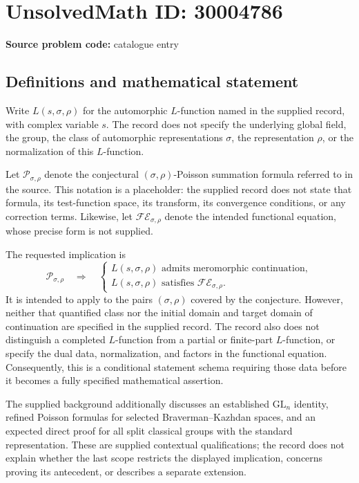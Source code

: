 \documentclass[11pt]{article}
\begin{document}
\section*{UnsolvedMath ID: 30004786}
\textbf{Source problem code:} catalogue entry
\subsection{Definitions and mathematical statement}
Write \(L(s,\sigma,\rho)\) for the automorphic \(L\)-function named in the supplied record, with complex variable \(s\). The record does not specify the underlying global field, the group, the class of automorphic representations \(\sigma\), the representation \(\rho\), or the normalization of this \(L\)-function.

Let \(\mathcal P_{\sigma,\rho}\) denote the conjectural \((\sigma,\rho)\)-Poisson summation formula referred to in the source. This notation is a placeholder: the supplied record does not state that formula, its test-function space, its transform, its convergence conditions, or any correction terms. Likewise, let \(\mathcal{FE}_{\sigma,\rho}\) denote the intended functional equation, whose precise form is not supplied.

The requested implication is
\[
\mathcal P_{\sigma,\rho}
\quad\Longrightarrow\quad
\left\{
\begin{array}{l}
L(s,\sigma,\rho)\text{ admits meromorphic continuation},\\
L(s,\sigma,\rho)\text{ satisfies }\mathcal{FE}_{\sigma,\rho}.
\end{array}
\right.
\]
It is intended to apply to the pairs \((\sigma,\rho)\) covered by the conjecture. However, neither that quantified class nor the initial domain and target domain of continuation are specified in the supplied record. The record also does not distinguish a completed \(L\)-function from a partial or finite-part \(L\)-function, or specify the dual data, normalization, and factors in the functional equation. Consequently, this is a conditional statement schema requiring those data before it becomes a fully specified mathematical assertion.

The supplied background additionally discusses an established \(\mathrm{GL}_n\) identity, refined Poisson formulas for selected Braverman--Kazhdan spaces, and an expected direct proof for all split classical groups with the standard representation. These are supplied contextual qualifications; the record does not explain whether the last scope restricts the displayed implication, concerns proving its antecedent, or describes a separate extension.
\end{document}
